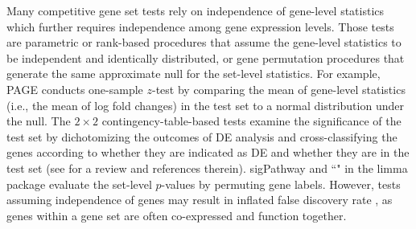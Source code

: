 	
	Many competitive gene set tests rely on independence of gene-level statistics which further 
	requires  
	independence among gene expression levels. Those tests are parametric or rank-based procedures
	that assume the gene-level statistics to be independent and identically distributed, or gene
	permutation procedures that generate the same approximate null for the set-level statistics. For
	example, PAGE  \citep{kim2005page} conducts one-sample $z$-test by comparing the mean of 
	gene-level
	statistics (i.e., the mean of log fold changes) in the test set to a normal distribution under 
	the
	null. The $2\times 2$ contingency-table-based tests examine the significance of the test set by
	dichotomizing the outcomes of DE analysis and cross-classifying the genes according to whether 
	they
	are indicated as DE and whether they are in the test set (see \cite{huang2009bioinformatics} 
	for a
	review and references therein). sigPathway \citep{tian2005discovering} and ``\gen" in the limma
	package \citep{Smyth2004moderated} evaluate the set-level $p$-values by permuting gene labels.
	However, tests assuming independence of genes may result in inflated false discovery rate
	\citep{efron2007testing,gatti2010heading,goeman2007analyzing, 
	wu2012camera,yaari2013quantitative},
	as genes within a gene set are often co-expressed and function together.
	
